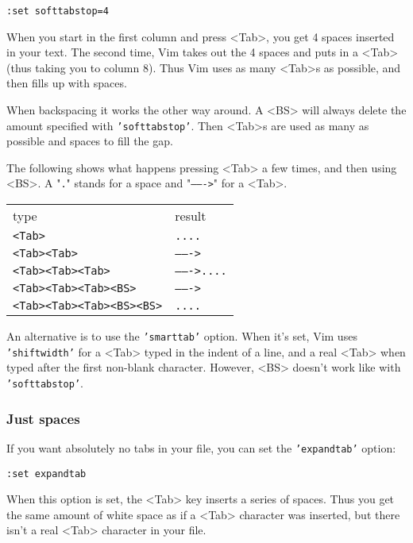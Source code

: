 \begin{Verbatim}[samepage=true]
 :set softtabstop=4
\end{Verbatim}

When you start in the first column and press <Tab>, you get 4 spaces inserted in your text.
The second time, Vim takes out the 4 spaces and puts in a <Tab> (thus taking you to column 8).
Thus Vim uses as many <Tab>s as possible, and then fills up with spaces.

When backspacing it works the other way around.
A <BS> will always delete the amount specified with \texttt{'softtabstop'}.
Then <Tab>s are used as many as possible and spaces to fill the gap.

The following shows what happens pressing <Tab> a few times, and then using <BS>.
A "\texttt{.}" stands for a space and "\texttt{------->}" for a <Tab>.

\begin{center} \begin{tabular}{l l}
type & result \\ 
\texttt{<Tab>} & \texttt{....} \\
\texttt{<Tab><Tab>} & \texttt{------->} \\
\texttt{<Tab><Tab><Tab>} & \texttt{------->....} \\
\texttt{<Tab><Tab><Tab><BS>} & \texttt{------->} \\
\texttt{<Tab><Tab><Tab><BS><BS>} & \texttt{....} \\		
\end{tabular} \end{center}

An alternative is to use the \texttt{'smarttab'} option.
When it's set, Vim uses \texttt{'shiftwidth'} for a <Tab> typed in the indent of a line, and a real <Tab> when typed after the first non-blank character.
However, <BS> doesn't work like with \texttt{'softtabstop'}.

\subsubsection{Just spaces}
If you want absolutely no tabs in your file, you can set the \texttt{'expandtab'} option:

\begin{Verbatim}[samepage=true]
 :set expandtab
\end{Verbatim}

When this option is set, the <Tab> key inserts a series of spaces.
Thus you get the same amount of white space as if a <Tab> character was inserted, but there isn't a real <Tab> character in your file.

